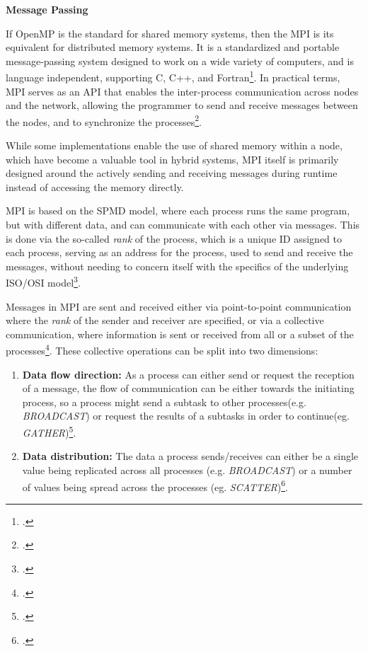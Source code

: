 \textbf{Message Passing}
\label{sec:message_passing}

If OpenMP is the standard for shared memory systems, then the \ac{MPI} is its equivalent for distributed memory systems.
It is a standardized and portable message-passing system designed to work on a wide variety of computers, and is language independent, supporting C, C++, and Fortran\footcite{groppUsingMPIPortable1999}.
In practical terms, \ac{MPI} serves as an \ac{API} that enables the inter-process communication across nodes and the network,
allowing the programmer to send and receive messages between the nodes, and to synchronize the processes\footcite{vishuvaishnavMessagePassingDistributed2023}.

While some implementations enable the use of shared memory within a node, which have become a valuable tool in hybrid systems,
\ac{MPI} itself is primarily designed around the actively sending and receiving messages
during runtime instead of accessing the memory directly.

\ac{MPI} is based on the \ac{SPMD} model, where each process runs the same program, but with different data, and can communicate with each other via messages.
This is done via the so-called \textit{rank} of the process, which is a unique \ac{ID} assigned to each process,
serving as an address for the process, used to send and receive the messages, without needing
to concern itself with the specifics of the underlying \gls{ISO/OSI model}\footcite{openmpiWhatOpenMPI2014}.

Messages in \ac{MPI} are sent and received either via point-to-point communication where the \textit{rank} of the sender and receiver are specified,
or via a collective communication, where information is sent or received from all or a subset of the processes\footcite{eickhoffTopologyAwareWorkloadAnalyzer}.
These collective operations can be split into two dimensions:

\begin{enumerate}
  \item \textbf{Data flow direction:} As a process can either send or request the reception of a message, the flow of communication can be either towards
        the initiating process, so a process might send a subtask to other processes(e.g. \textit{BROADCAST}) or request the results of a subtasks in order to continue(eg. \textit{GATHER})\footcite{dartmouthcollegeMPICollectiveCommunication}.
  \item \textbf{Data distribution:}
        The data a process sends/receives can either be a single value being replicated  across all processes (e.g. \textit{BROADCAST}) or a number of values being spread across the processes (eg. \textit{SCATTER})\footcite{dartmouthcollegeMPICollectiveCommunication}.
\end{enumerate}

